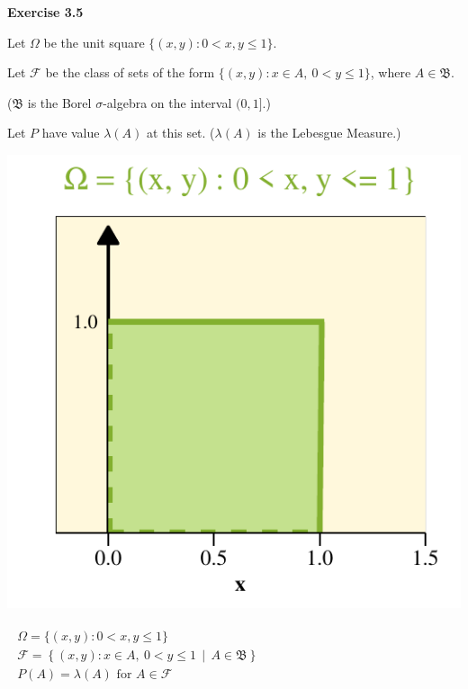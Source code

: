     \newpage
    
    
     \hfill \textbf{\scriptsize Exercise 3.5}

    Let \(\Omega\) be the unit square \(\{(x, y) : 0 < x, y \leq 1\}\).

Let \(\mathcal{F}\) be the class of sets of the form
\(\{(x, y) : x \in A,\ 0 < y \leq 1\}\), where \(A \in \mathfrak{B}\).

\phantom{Let }\elbowarrow (\(\mathfrak{B}\) is the Borel
\(\sigma\)-algebra on the interval \((0,1]\).)

Let \(P\) have value \(\lambda(A)\) at this set. (\(\lambda(A)\) is the
Lebesgue Measure.)

\hfill
\begin{minipage}{0.39\textwidth}
  \includegraphics[width=\linewidth]{unit-square.pdf}
  \vspace{-1ex}
\end{minipage}
\hspace*{-1.5em}

\vspace{-0.39\textwidth}

\[
\begin{split}
\begin{gathered}
    \Omega= \{(x, y) : 0 < x, y \leq 1\}\\
    \mathcal{F} = \left\{(x, y) : x \in A,\ 0 < y \leq 1 \,\middle|\, A \in \mathfrak{B} \right\}\\
    P(A)= \lambda(A) \text{ for } A \in \mathcal{F} 
\end{gathered}
\end{split}
\begin{split}
\phantom{aaaaaaaaaaaaaaaaaaaaaaaaaaaaaa}
\end{split}
\]

